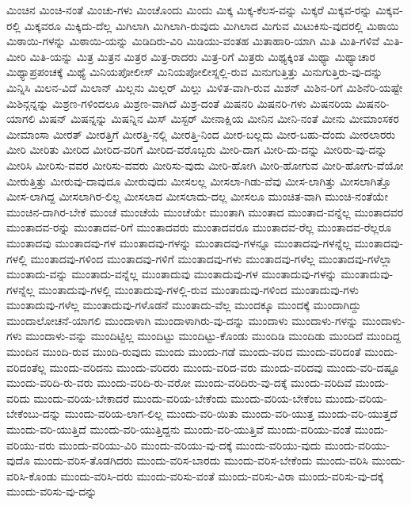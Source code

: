 {ಮಿಂಚಿನ
ಮಿಂಚಿ-ನಂತೆ
ಮಿಂಚು-ಗಳು
ಮಿಂಚೊಂದು
ಮಿಂದು
ಮಿಕ್ಕ
ಮಿಕ್ಕ-ಕೆಲಸ-ವನ್ನು
ಮಿಕ್ಕರೆ
ಮಿಕ್ಕವ-ರನ್ನು
ಮಿಕ್ಕವ-ರಲ್ಲಿ
ಮಿಕ್ಕವರೂ
ಮಿಕ್ಕಿದು-ದೆಲ್ಲ
ಮಿಗಿಲಾಗಿ
ಮಿಗಿಲಾಗಿ-ರುವುದು
ಮಿಗಿಲಾದ
ಮಿಗುವ
ಮಿಟುಕಿಸು-ವುದರಲ್ಲಿ
ಮಿಠಾಯಿ
ಮಿಠಾಯಿ-ಗಳನ್ನು
ಮಿಠಾಯಿ-ಯನ್ನು
ಮಿಡಿದಿರು-ವಿರಿ
ಮಿಡಿಯು-ವಂತಹ
ಮಿತಾಹಾರಿ-ಯಾಗಿ
ಮಿತಿ
ಮಿತಿ-ಗಳಿವೆ
ಮಿತಿ-ಮೀರಿ
ಮಿತಿ-ಯನ್ನು
ಮಿತ್ರ
ಮಿತ್ರನ
ಮಿತ್ರರ
ಮಿತ್ರ-ರಾದರು
ಮಿತ್ರ-ರಿಗೆ
ಮಿತ್ರರು
ಮಿಥ್ಯಕ್ಕಿಂತ
ಮಿಥ್ಯಾ
ಮಿಥ್ಯಾಚಾರ
ಮಿಥ್ಯಾಪ್ರಪಂಚಕ್ಕೆ
ಮಿಥ್ಯೆ
ಮಿನಿಯಪೋಲೀಸ್
ಮಿನಿಯಪೋಲೀಸ್ನಲ್ಲಿ-ರುವ
ಮಿನುಗುತ್ತಿತ್ತು
ಮಿನುಗುತ್ತಿರು-ವು-ದನ್ನು
ಮಿನ್ನಿಸಿ
ಮಿಲನ-ವಿದೆ
ಮಿಲಾನ್
ಮಿಲ್ಲನು
ಮಿಲ್ಲರ್
ಮಿಲ್ಲು
ಮಿಳಿತ-ವಾಗಿ-ರುವ
ಮಿಶನ್
ಮಿಶಿನ-ರಿಗೆ
ಮಿಶಿನೆರಿ-ಯಷ್ಟೇ
ಮಿಶಿನ್ಗನ್ನನ್ನು
ಮಿಶ್ರಣ-ಗಳಿಂದಲೂ
ಮಿಶ್ರಣ-ವಾಗಿದೆ
ಮಿಶ್ರ-ದಂತೆ
ಮಿಷನರಿ
ಮಿಷನರಿ-ಗಳು
ಮಿಷನರಿಯ
ಮಿಷನರಿ-ಯಾಗಲಿ
ಮಿಷನ್
ಮಿಷನ್ನನ್ನು
ಮಿಷನ್ನಿನ
ಮಿಸ್
ಮಿಸ್ಟರ್
ಮೀನಾಕ್ಷಿಯ
ಮೀನಿನ
ಮೀನಿ-ನಂತೆ
ಮೀನು
ಮೀಮಾಂಸಕರ
ಮೀಮಾಂಸಾ
ಮೀರತ್
ಮೀರತ್ತಿಗೆ
ಮೀರತ್ತಿ-ನಲ್ಲಿ
ಮೀರತ್ತಿ-ನಿಂದ
ಮೀರ-ಬಲ್ಲದು
ಮೀರ-ಬಹು-ದೆಂದು
ಮೀರಲಾರರು
ಮೀರಿ
ಮೀರಿತು
ಮೀರಿದ
ಮೀರಿದ-ವರಿಗೆ
ಮೀರಿದ-ವರೊಬ್ಬರು
ಮೀರಿ-ದಾಗ
ಮೀರಿ-ದು-ದನ್ನು
ಮೀರಿರು-ವು-ದನ್ನು
ಮೀರಿಸಿ
ಮೀರಿಸು-ವವರ
ಮೀರಿಸು-ವವರು
ಮೀರಿಸು-ವುದು
ಮೀರಿ-ಹೋಗಿ
ಮೀರಿ-ಹೋಗುವ
ಮೀರಿ-ಹೋಗು-ವೆಯೋ
ಮೀರುತ್ತಿತ್ತು
ಮೀರುವು-ದಾವುದೂ
ಮೀರುವುದು
ಮೀಸಲಲ್ಲ
ಮೀಸಲಾ-ಗಿಡು-ವೆವು
ಮೀಸ-ಲಾಗಿತ್ತು
ಮೀಸಲಾಗಿತ್ತೊ
ಮೀಸ-ಲಾಗಿದ್ದ
ಮೀಸಲಾಗಿರ-ಲಿಲ್ಲ
ಮೀಸಲಾದ
ಮೀಸಲಾದು-ದಲ್ಲ
ಮೀಸಲೂ
ಮುಂಚಿತ-ವಾಗಿ
ಮುಂಚಿ-ನಂತೆಯೇ
ಮುಂಚಿನ-ದಾಗಿರ-ಬೇಕೆ
ಮುಂಚೆ
ಮುಂಚೆಯೆ
ಮುಂಚೆಯೇ
ಮುಂತಾಗಿ
ಮುಂತಾದ
ಮುಂತಾದ-ವನ್ನೆಲ್ಲ
ಮುಂತಾದವರ
ಮುಂತಾದವ-ರನ್ನು
ಮುಂತಾದವ-ರಿಗೆ
ಮುಂತಾದವರು
ಮುಂತಾದವರೂ
ಮುಂತಾದವ-ರೆಲ್ಲ
ಮುಂತಾದವ-ರೆಲ್ಲರೂ
ಮುಂತಾದವು
ಮುಂತಾದವು-ಗಳ
ಮುಂತಾದವು-ಗಳನ್ನು
ಮುಂತಾದವು-ಗಳನ್ನೂ
ಮುಂತಾದವು-ಗಳನ್ನೆಲ್ಲ
ಮುಂತಾದವು-ಗಳಲ್ಲಿ
ಮುಂತಾದವು-ಗಳಿಂದ
ಮುಂತಾದವು-ಗಳಿಗೆ
ಮುಂತಾದವು-ಗಳು
ಮುಂತಾದವು-ಗಳೆಲ್ಲ
ಮುಂತಾದವು-ಗಳೆಲ್ಲಾ
ಮುಂತಾದು-ವನ್ನು
ಮುಂತಾದು-ವನ್ನೆಲ್ಲ
ಮುಂತಾದುವು
ಮುಂತಾದುವು-ಗಳ
ಮುಂತಾದುವು-ಗಳನ್ನು
ಮುಂತಾದುವು-ಗಳನ್ನೆಲ್ಲ
ಮುಂತಾದುವು-ಗಳಲ್ಲಿ
ಮುಂತಾದುವು-ಗಳಲ್ಲಿ-ರುವ
ಮುಂತಾದುವು-ಗಳಿಂದ
ಮುಂತಾದುವು-ಗಳು
ಮುಂತಾದುವು-ಗಳೆಲ್ಲ
ಮುಂತಾದುವು-ಗಳೊಡನೆ
ಮುಂತಾದು-ವೆಲ್ಲ
ಮುಂದಕ್ಕೂ
ಮುಂದಕ್ಕೆ
ಮುಂದಾಗಿದ್ದು
ಮುಂದಾಲೋಚನೆ-ಯಾಗಲಿ
ಮುಂದಾಳಾಗಿ
ಮುಂದಾಳಾಗಿರು-ವು-ದನ್ನು
ಮುಂದಾಳು
ಮುಂದಾಳು-ಗಳನ್ನು
ಮುಂದಾಳು-ಗಳು
ಮುಂದಾಳು-ವನ್ನು
ಮುಂದಿಟ್ಟಿಲ್ಲ
ಮುಂದಿಟ್ಟು
ಮುಂದಿಟ್ಟು-ಕೊಂಡು
ಮುಂದಿಡಿ
ಮುಂದಿಡು
ಮುಂದಿದೆ
ಮುಂದಿದ್ದ
ಮುಂದಿನ
ಮುಂದಿ-ರುವ
ಮುಂದಿ-ರುವುದು
ಮುಂದು
ಮುಂದು-ಗಡೆ
ಮುಂದು-ವರಿದ
ಮುಂದು-ವರಿದಂತೆ
ಮುಂದು-ವರಿದಂತೆಲ್ಲ
ಮುಂದು-ವರಿದನು
ಮುಂದು-ವರಿದರು
ಮುಂದು-ವರಿದ-ವರು
ಮುಂದು-ವರಿದವು
ಮುಂದು-ವರಿ-ದಷ್ಟೂ
ಮುಂದು-ವರಿದಿ-ರು-ವರು
ಮುಂದು-ವರಿದಿ-ರು-ವರೋ
ಮುಂದು-ವರಿದಿರು-ವು-ದಕ್ಕೆ
ಮುಂದು-ವರಿದಿವೆ
ಮುಂದು-ವರಿದು
ಮುಂದು-ವರಿಯ-ಬೇಕಾದರೆ
ಮುಂದು-ವರಿಯ-ಬೇಕೆಂದು
ಮುಂದು-ವರಿಯ-ಬೇಕೆಂಬ
ಮುಂದು-ವರಿಯ-ಬೇಕೆಂಬು-ದನ್ನು
ಮುಂದು-ವರಿಯ-ಲಾಗ-ಲಿಲ್ಲ
ಮುಂದು-ವರಿ-ಯಿತು
ಮುಂದು-ವರಿ-ಯುತ್ತ
ಮುಂದು-ವರಿ-ಯುತ್ತದೆ
ಮುಂದು-ವರಿ-ಯುತ್ತಿದೆ
ಮುಂದು-ವರಿ-ಯುತ್ತಿದ್ದನು
ಮುಂದು-ವರಿ-ಯುತ್ತಿವೆ
ಮುಂದು-ವರಿಯು-ವಂತೆ
ಮುಂದು-ವರಿಯು-ವರು
ಮುಂದು-ವರಿಯು-ವಿರಿ
ಮುಂದು-ವರಿಯು-ವು-ದಕ್ಕೆ
ಮುಂದು-ವರಿಯು-ವುದು
ಮುಂದು-ವರಿಯು-ವುದೊ
ಮುಂದು-ವರಿಸ-ತೊಡಗಿದರು
ಮುಂದು-ವರಿಸ-ಬಾರದು
ಮುಂದು-ವರಿಸ-ಬೇಕೆಂದು
ಮುಂದು-ವರಿಸಿ
ಮುಂದು-ವರಿಸಿ-ಕೊಂಡು
ಮುಂದು-ವರಿಸಿ-ದರು
ಮುಂದು-ವರಿಸು-ವಂತೆ
ಮುಂದು-ವರಿಸು-ವಿರಾ
ಮುಂದು-ವರಿಸು-ವು-ದಕ್ಕೆ
ಮುಂದು-ವರಿಸು-ವು-ದನ್ನು
}
